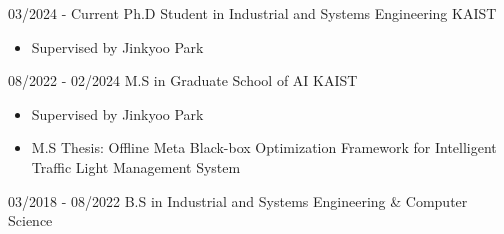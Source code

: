 \documentclass[10pt]{developercv} %
\begin{document}
\begin{entrylist}
    \entry
        {03/2024 - Current}
        {Ph.D Student in Industrial and Systems Engineering}
        {KAIST}
        {\vspace{-7pt}
        \begin{itemize}[noitemsep,topsep=0pt,parsep=2pt,partopsep=0pt, leftmargin=0pt]
            \item[] Supervised by Jinkyoo Park
        \end{itemize}
        }
    \entry
		{08/2022 - 02/2024}
		{M.S in Graduate School of AI}
		{KAIST}
		{\vspace{-7pt}
        \begin{itemize}[noitemsep,topsep=0pt,parsep=2pt,partopsep=0pt, leftmargin=0pt]
            \item[] Supervised by Jinkyoo Park
            \item[] M.S Thesis: Offline Meta Black-box Optimization Framework for Intelligent Traffic Light Management System
        \end{itemize}
        }
	\entry
		{03/2018 - 08/2022}
		{B.S in Industrial and Systems Engineering \& Computer Science} 

\end{entrylist}
\end{document}
